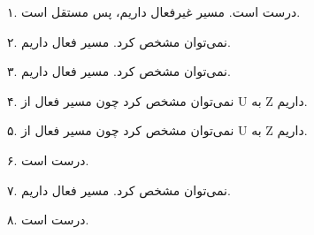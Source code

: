 

۱. درست است. مسیر غیرفعال داریم، پس مستقل است.


۲. نمی‌توان مشخص کرد. مسیر فعال داریم.


۳. نمی‌توان مشخص کرد. مسیر فعال داریم.


۴. نمی‌توان مشخص کرد چون مسیر فعال از U به Z داریم.


۵. نمی‌توان مشخص کرد چون مسیر فعال از U به Z داریم.


۶. درست است.


۷. نمی‌توان مشخص کرد. مسیر فعال داریم.


۸. درست است. 